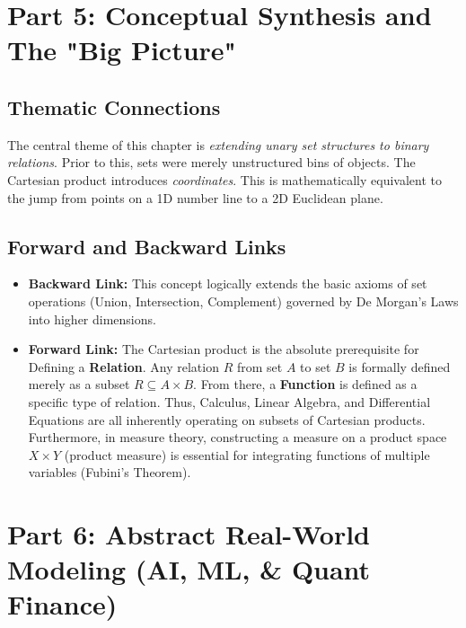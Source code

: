 \documentclass[12pt]{article}
\theoremstyle{definition}
\theoremstyle{remark}
\begin{document}
\section{Part 5: Conceptual Synthesis and The "Big Picture"}

\subsection{Thematic Connections}
The central theme of this chapter is \textit{extending unary set structures to binary relations}. Prior to this, sets were merely unstructured bins of objects. The Cartesian product introduces \textit{coordinates}. This is mathematically equivalent to the jump from points on a 1D number line to a 2D Euclidean plane. 

\subsection{Forward and Backward Links}
\begin{itemize}
    \item \textbf{Backward Link:} This concept logically extends the basic axioms of set operations (Union, Intersection, Complement) governed by De Morgan's Laws into higher dimensions. 
    \item \textbf{Forward Link:} The Cartesian product is the absolute prerequisite for Defining a \textbf{Relation}. Any relation $R$ from set $A$ to set $B$ is formally defined merely as a subset $R \subseteq A \times B$. From there, a \textbf{Function} is defined as a specific type of relation. Thus, Calculus, Linear Algebra, and Differential Equations are all inherently operating on subsets of Cartesian products. Furthermore, in measure theory, constructing a measure on a product space $X \times Y$ (product measure) is essential for integrating functions of multiple variables (Fubini's Theorem).
\end{itemize}

\section{Part 6: Abstract Real-World Modeling (AI, ML, \& Quant Finance)}
\end{document}
